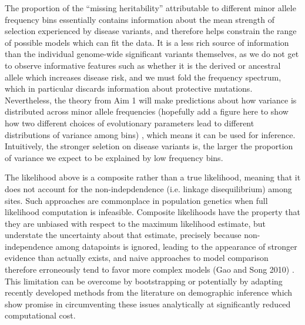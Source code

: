 \documentclass[11pt]{article}
\newcommand{\jb}[1]{{\color{blue} (#1)} }
\begin{document}
The proportion of the ``missing heritability'' attributable to different minor allele frequency bins essentially contains information about the mean strength of selection experienced by disease variants, and therefore helps constrain the range of possible models which can fit the data. It is a less rich source of information than the individual genome-wide significant variants themselves, as we do not get to observe informative features such as whether it is the derived or ancestral allele which increases disease risk, and we must fold the frequency spectrum, which in particular discards information about protective mutations\cite{Bustamante:2001wi}. Nevertheless, the theory from Aim 1 will make predictions about how variance is distributed across minor allele frequencies \jb{hopefully add a figure here to show how two different choices of evolutionary parameters lead to different distributions of variance among bins}, which means it can be used for inference. Intuitively, the stronger seletion on disease variants is, the larger the proportion of variance we expect to be explained by low frequency bins.


The likelihood above is a composite rather than a true likelihood, meaning that it does not account for the non-indepdendence (i.e. linkage disequilibrium) among sites. Such approaches are commonplace in population genetics when full likelihood computation is infeasible. Composite likelihoods have the property that they are unbiased with respect to the maximum likelihood estimate, but understate the uncertainty about that estimate, precisely because non-independence among datapoints is ignored, leading to the appearance of stronger evidence than actually exists, and naive approaches to model comparison therefore erroneously tend to favor more complex models \jb{Gao and Song 2010}. This limitation can be overcome by bootstrapping or potentially by adapting recently developed methods from the literature on demographic inference which show promise in circumventing these issues analytically at significantly reduced computational cost. 
\end{document}
